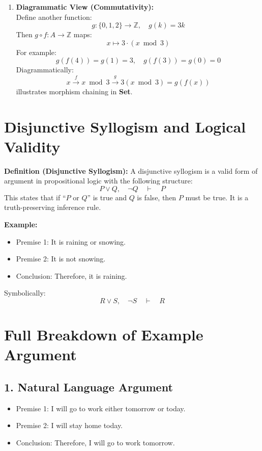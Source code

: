 \documentclass[10pt]{article}
\theoremstyle{plain}
\theoremstyle{definition}
\begin{document}
\begin{enumerate}
  	\item \textbf{Diagrammatic View (Commutativity):} \\
  	Define another function:
  	\[
  	g : \{0,1,2\} \to \mathbb{Z}, \quad g(k) = 3k
  	\]
  	Then \( g \circ f : A \to \mathbb{Z} \) maps:
  	\[
  	x \mapsto 3 \cdot (x \bmod 3)
  	\]
  	For example:
  	\[
  	g(f(4)) = g(1) = 3, \quad g(f(3)) = g(0) = 0
  	\]
  	Diagrammatically:
  	\[
  	x \xrightarrow{f} x \bmod 3 \xrightarrow{g} 3(x \bmod 3) = g(f(x))
  	\]
  	illustrates morphism chaining in \textbf{Set}.
  \end{enumerate}
  \section*{Disjunctive Syllogism and Logical Validity}
  
  \textbf{Definition (Disjunctive Syllogism):}  
  A disjunctive syllogism is a valid form of argument in propositional logic with the following structure:
  \[
  P \lor Q,\quad \lnot Q \quad \vdash \quad P
  \]
  This states that if ``$P$ or $Q$'' is true and $Q$ is false, then $P$ must be true. It is a truth-preserving inference rule.
  
  \textbf{Example:}  
  \begin{itemize}
  	\item Premise 1: It is raining or snowing.
  	\item Premise 2: It is not snowing.
  	\item Conclusion: Therefore, it is raining.
  \end{itemize}
  Symbolically:
  \[
  R \lor S,\quad \lnot S \quad \vdash \quad R
  \]
  
  \section*{Full Breakdown of Example Argument}
  
  \subsection*{1. Natural Language Argument}
  \begin{itemize}
  	\item Premise 1: I will go to work either tomorrow or today.
  	\item Premise 2: I will stay home today.
  	\item Conclusion: Therefore, I will go to work tomorrow.
  \end{itemize}
  
\end{document}

